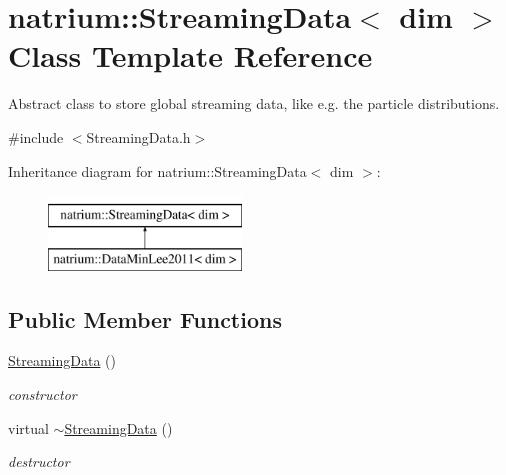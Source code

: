 \hypertarget{classnatrium_1_1StreamingData}{\section{natrium\-:\-:\-Streaming\-Data$<$ dim $>$ \-Class \-Template \-Reference}
\label{classnatrium_1_1StreamingData}
}


\-Abstract class to store global streaming data, like e.\-g. the particle distributions.  




{\ttfamily \#include $<$\-Streaming\-Data.\-h$>$}

\-Inheritance diagram for natrium\-:\-:\-Streaming\-Data$<$ dim $>$\-:\begin{figure}[H]
\begin{center}
\leavevmode
\includegraphics[height=2.000000cm]{classnatrium_1_1StreamingData}
\end{center}
\end{figure}
\subsection*{\-Public \-Member \-Functions}
\begin{DoxyCompactItemize}
\item 
\hypertarget{classnatrium_1_1StreamingData_a176886d4ba1765194fe675775a2f6087}{\hyperlink{classnatrium_1_1StreamingData_a176886d4ba1765194fe675775a2f6087}{\-Streaming\-Data} ()}\label{classnatrium_1_1StreamingData_a176886d4ba1765194fe675775a2f6087}

\begin{DoxyCompactList}\small\item\em constructor \end{DoxyCompactList}\item 
\hypertarget{classnatrium_1_1StreamingData_a11f35edbebcb05646e034f6a918cf7c7}{virtual \hyperlink{classnatrium_1_1StreamingData_a11f35edbebcb05646e034f6a918cf7c7}{$\sim$\-Streaming\-Data} ()}\label{classnatrium_1_1StreamingData_a11f35edbebcb05646e034f6a918cf7c7}

\begin{DoxyCompactList}\small\item\em destructor \end{DoxyCompactList}\end{DoxyCompactItemize}


